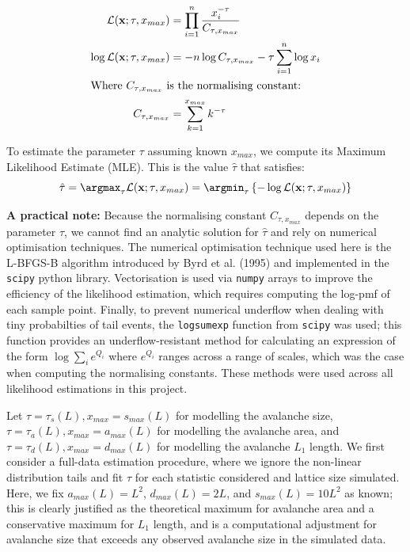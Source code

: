 \begin{align*}
    \mathcal{L}(\mathbf{x}; \tau, x_{max}) &= \prod_{i=1}^n \frac{x_i^{-\tau}}{C_{\tau, x_{max}}} \\
    \log \mathcal{L}(\mathbf{x}; \tau, x_{max}) &= -n \log C_{\tau, x_{max}} -\tau \sum_{i=1}^n \log{x_i} \\
    \intertext{Where $C_{\tau, x_{max}}$ is the normalising constant:}
    C_{\tau, x_{max}} &= \sum_{k=1}^{x_{max}} k^{-\tau}
\end{align*}

To estimate the parameter $\tau$ assuming known $x_{max}$, we compute its Maximum Likelihood Estimate (MLE).
This is the value $\hat{\tau}$ that satisfies:
\[\hat{\tau} = \argmax_{\tau} \mathcal{L}(\mathbf{x}; \tau, x_{max}) = \argmin_{\tau} \left\{- \log \mathcal{L}(\mathbf{x}; \tau, x_{max}) \right\}\]

\textbf{A practical note:} Because the normalising constant $C_{\tau, x_{max}}$ depends on the parameter $\tau$, we cannot find an analytic solution for $\hat{\tau}$ and rely on numerical optimisation techniques.
The numerical optimisation technique used here is the L-BFGS-B algorithm introduced by Byrd et al. (1995) \cite{byrd1995limited} and implemented in the \texttt{scipy} python library. 
Vectorisation is used via \texttt{numpy} arrays to improve the efficiency of the likelihood estimation, which requires computing the log-pmf of each sample point. 
Finally, to prevent numerical underflow when dealing with tiny probabilties of tail events, the \texttt{logsumexp} function from \texttt{scipy} was used; this function provides an underflow-resistant method for calculating an expression of the form $\log \sum_{i} e^{Q_i}$ where $e^{Q_i}$ ranges across a range of scales, which was the case when computing the normalising constants.
These methods were used across all likelihood estimations in this project.

Let $\tau = \tau_s(L), x_{max} = s_{max}(L)$ for modelling the avalanche size, $\tau = \tau_a(L), x_{max} = a_{max}(L)$ for modelling the avalanche area, and $\tau = \tau_d(L), x_{max} = d_{max}(L)$ for modelling the avalanche $L_1$ length.
We first consider a full-data estimation procedure, where we ignore the non-linear distribution tails and fit $\tau$ for each statistic considered and lattice size simulated. Here, we fix $a_{max}(L) = L^2$, $d_{max}(L) = 2L$, and $s_{max}(L) = 10L^2$ as known; this is clearly justified as the theoretical maximum for avalanche area and a conservative maximum for $L_1$ length, and is a computational adjustment for avalanche size that exceeds any observed avalanche size in the simulated data.

